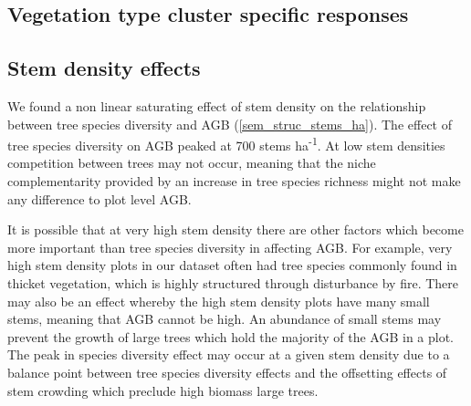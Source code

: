 \documentclass[11pt,a4paper]{article}
\begin{document}
\subsection{Vegetation type cluster specific responses}


\subsection{Stem density effects}

We found a non linear saturating effect of stem density on the relationship between tree species diversity and AGB (\autoref{sem_struc_stems_ha}). The effect of tree species diversity on AGB peaked at \textapprox{}700 stems ha\textsuperscript{-1}. At low stem densities competition between trees may not occur, meaning that the niche complementarity provided by an increase in tree species richness might not make any difference to plot level AGB.

It is possible that at very high stem density there are other factors which become more important than tree species diversity in affecting AGB. For example, very high stem density plots in our dataset often had tree species commonly found in thicket vegetation, which is highly structured through disturbance by fire. There may also be an effect whereby the high stem density plots have many small stems, meaning that AGB cannot be high. An abundance of small stems may prevent the growth of large trees which hold the majority of the AGB in a plot. The peak in species diversity effect may occur at a given stem density due to a balance point between tree species diversity effects and the offsetting effects of stem crowding which preclude high biomass large trees.






\end{document}
